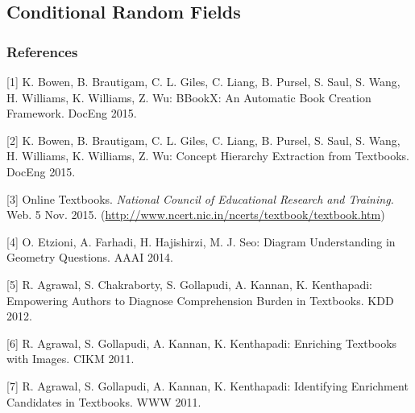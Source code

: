 \documentclass{article} %
\begin{document}
\subsection{Conditional Random Fields}


\subsubsection*{References}

[1] K. Bowen, B. Brautigam, C. L. Giles, C. Liang, B. Pursel, S. Saul, S. Wang, H. Williams, K. Williams, Z. Wu: BBookX: An Automatic Book Creation Framework. DocEng 2015.

[2] K. Bowen, B. Brautigam, C. L. Giles, C. Liang, B. Pursel, S. Saul, S. Wang, H. Williams, K. Williams, Z. Wu: Concept Hierarchy Extraction from Textbooks. DocEng 2015.

[3] Online Textbooks. {\it National Council of Educational Research and Training.} Web. 5 Nov. 2015. (\url{http://www.ncert.nic.in/ncerts/textbook/textbook.htm})

[4] O. Etzioni, A. Farhadi, H. Hajishirzi, M. J. Seo: Diagram Understanding in Geometry Questions. AAAI 2014.

[5] R. Agrawal, S. Chakraborty, S. Gollapudi, A. Kannan, K. Kenthapadi: Empowering Authors to Diagnose Comprehension Burden in Textbooks. KDD 2012.

[6] R. Agrawal, S. Gollapudi, A. Kannan, K. Kenthapadi: Enriching Textbooks with Images. CIKM 2011. 

[7] R. Agrawal, S. Gollapudi, A. Kannan, K. Kenthapadi: Identifying Enrichment Candidates in Textbooks. WWW 2011.
\end{document}
